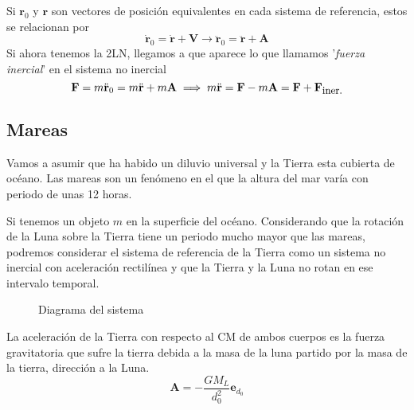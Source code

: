 Si $\mathbf{r}_0$ y $\mathbf{r}$ son vectores de posición equivalentes en cada sistema de referencia, estos se relacionan por
\begin{equation} \label{6.1.1}
    \dot{\mathbf{r}}_0=\dot{\mathbf{r}}+\mathbf{V} \rightarrow \ddot{\mathbf{r}}_0=\ddot{\mathbf{r}}+\mathbf{A}
\end{equation} 
Si ahora tenemos la 2LN, llegamos a que aparece lo que llamamos '\textit{fuerza inercial}' en el sistema no inercial
\begin{equation} \label{6.1.1}
    \mathbf{F} = m\ddot{\mathbf{r}}_0 = m\ddot{\mathbf{r}} + m \mathbf{A} \implies m\ddot{\mathbf{r}} = \mathbf{F}-m \mathbf{A} = \mathbf{F}+\mathbf{F}_{\mbox{\small iner.}}
\end{equation} 
\vspace{-25pt}
\subsection{Mareas}
Vamos a asumir que ha habido un diluvio universal y la Tierra esta cubierta de océano. Las mareas son un fenómeno en el que la altura del mar varía con periodo de unas 12 horas.

Si tenemos un objeto $m$ en la superficie del océano. Considerando que la rotación de la Luna sobre la Tierra tiene un periodo mucho mayor que las mareas, podremos considerar el sistema de referencia de la Tierra como un sistema no inercial con aceleración rectilínea y que la Tierra y la Luna no rotan en ese intervalo temporal.
\begin{figure}[H]
    \def\svgwidth{15 cm}
    \normalsize
	
    \vspace{-75pt}
    \caption{Diagrama del sistema}
\end{figure}
\vspace{15pt}
La aceleración de la Tierra con respecto al CM de ambos cuerpos es la fuerza gravitatoria que sufre la tierra debida a la masa de la luna partido por la masa de la tierra, dirección a la Luna.
\begin{equation} \label{6.1.1}
    \mathbf{A} = -\frac{G M_L}{d_0^2} \mathbf{e}_{d_0}
\end{equation} 

